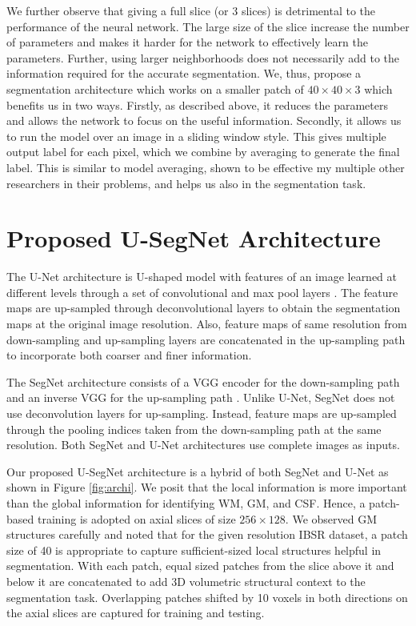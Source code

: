 \documentclass{article}
\begin{document}
We further observe that giving a full slice (or 3 slices) is detrimental to the performance of the neural network. The large size of the slice increase the number of parameters and makes it harder for the network to effectively learn the parameters. Further, using larger neighborhoods does not necessarily add to the information required for the accurate segmentation. We, thus, propose a segmentation architecture which works on a smaller patch of $40 \times 40 \times 3$ which benefits us in two ways. Firstly, as described above, it reduces the parameters and allows the network to focus on the useful information. Secondly, it allows us to run the model over an image in a sliding window style. This gives multiple output label for each pixel, which we combine by averaging to generate the final label. This is similar to model averaging, shown to be effective my multiple other researchers in their problems, and helps us also in the segmentation task.



\section{Proposed U-SegNet Architecture}

The U-Net architecture is U-shaped model with features of an image learned at different levels through a set of convolutional and max pool layers \cite{u-net}. The feature maps are up-sampled through deconvolutional layers to obtain the segmentation maps at the original image resolution. Also, feature maps of same resolution from down-sampling and up-sampling layers are concatenated in the up-sampling path to incorporate both coarser and finer information.

The SegNet architecture consists of a VGG encoder for the down-sampling path and an inverse VGG for the up-sampling path \cite{badrinarayanan2017segnet}. Unlike U-Net, SegNet does not use deconvolution layers for up-sampling. Instead, feature maps are up-sampled through the pooling indices taken from the down-sampling path at the same resolution. Both SegNet and U-Net architectures use complete images as inputs.

Our proposed U-SegNet architecture is a hybrid of both SegNet and U-Net as shown in Figure \ref{fig:archi}. We posit that the local information is more important than the global information for identifying WM, GM, and CSF. Hence, a patch-based training is adopted on axial slices of size $256 \times 128$. We observed GM structures carefully and noted that for the given resolution IBSR dataset, a patch size of 40 is appropriate to capture sufficient-sized local structures helpful in segmentation. With each patch, equal sized patches from the slice above it and below it are concatenated to add 3D volumetric structural context to the segmentation task.  Overlapping patches shifted by 10 voxels in both directions on the axial slices are captured for training and testing.
\end{document}
